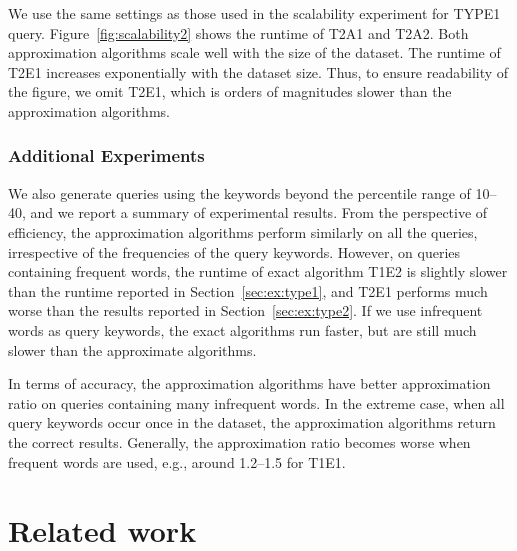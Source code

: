 \documentclass{sig-alternate}
\begin{document}
\vspace{1ex}  We use the same settings
as those used in the scalability experiment for TYPE1 query.
Figure~\ref{fig:scalability2} shows the runtime of T2A1 and T2A2.
Both approximation algorithms scale well with the size of the
dataset.
%
The runtime of T2E1 increases exponentially with the dataset size.
Thus, to ensure readability of the figure, we omit T2E1, which is
orders of magnitudes slower than the approximation algorithms.

\subsubsection{Additional Experiments}\label{sec:rand_query}

We also generate queries using the keywords beyond the percentile
range of 10--40, and we report a summary of experimental results.
From the perspective of efficiency,  the approximation algorithms
perform similarly on all the queries, irrespective of the
frequencies of the query keywords. However, on queries containing
frequent words, the runtime of exact algorithm T1E2 is slightly
slower than the runtime reported in Section~\ref{sec:ex:type1}, and
T2E1 performs much worse than the results reported in
Section~\ref{sec:ex:type2}. If we use infrequent words as query
keywords, the exact algorithms run faster, but are still much slower
than the approximate algorithms.


In terms of accuracy, the approximation algorithms have better
approximation ratio on queries containing many infrequent words. In
the extreme case, when all query keywords occur once in the dataset,
the approximation algorithms return the correct results. Generally,
the approximation ratio becomes worse when frequent words are used,
e.g., around 1.2--1.5 for T1E1.


\vspace{-1ex}
\section{Related work} \label{sec:related}
\end{document}
